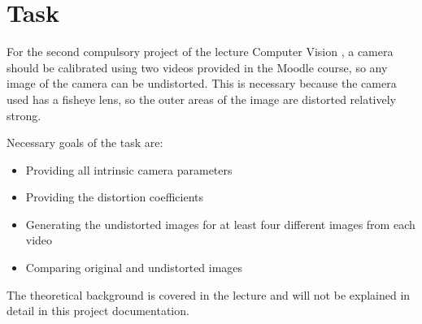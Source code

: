 \chapter{Task}
For the second compulsory project of the lecture Computer Vision \cite{cv_lecture_ex}, a camera should be calibrated using two videos provided in the Moodle course, so any image of the camera can be undistorted. This is necessary because the camera used has a fisheye lens, so the outer areas of the image are distorted relatively strong.

Necessary goals of the task are:
\begin{itemize}
    \item Providing all intrinsic camera parameters
    \item Providing the distortion coefficients
    \item Generating the undistorted images for at least four different images from each video
    \item Comparing original and undistorted images
\end{itemize}

The theoretical background is covered in the lecture and will not be explained in detail in this project documentation.
